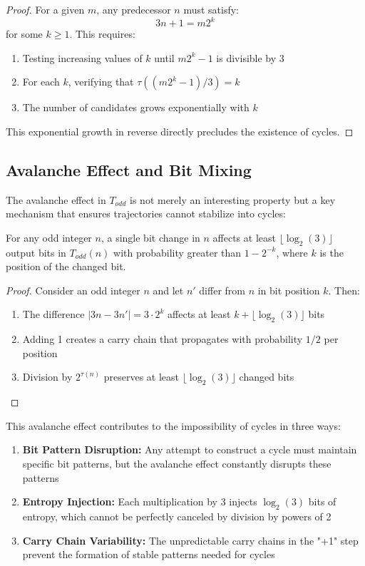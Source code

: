 \begin{proof}
For a given $m$, any predecessor $n$ must satisfy:
\[
3n + 1 = m2^k
\]
for some $k \geq 1$. This requires:
\begin{enumerate}
\item Testing increasing values of $k$ until $m2^k - 1$ is divisible by 3
\item For each $k$, verifying that $\tau((m2^k - 1)/3) = k$
\item The number of candidates grows exponentially with $k$
\end{enumerate}
This exponential growth in reverse directly precludes the existence of cycles.
\end{proof}

\subsection{Avalanche Effect and Bit Mixing}

The avalanche effect in $T_{odd}$ is not merely an interesting property but a key mechanism that ensures trajectories cannot stabilize into cycles:

\begin{theorem}\label{thm:avalanche}
For any odd integer $n$, a single bit change in $n$ affects at least $\lfloor \log_2(3) \rfloor$ output bits in $T_{odd}(n)$ with probability greater than $1 - 2^{-k}$, where $k$ is the position of the changed bit.
\end{theorem}

\begin{proof}
Consider an odd integer $n$ and let $n'$ differ from $n$ in bit position $k$. Then:
\begin{enumerate}
\item The difference $|3n - 3n'| = 3 \cdot 2^k$ affects at least $k + \lfloor \log_2(3) \rfloor$ bits
\item Adding 1 creates a carry chain that propagates with probability $1/2$ per position
\item Division by $2^{\tau(n)}$ preserves at least $\lfloor \log_2(3) \rfloor$ changed bits
\end{enumerate}
\end{proof}

This avalanche effect contributes to the impossibility of cycles in three ways:
\begin{enumerate}
\item \textbf{Bit Pattern Disruption:} Any attempt to construct a cycle must maintain specific bit patterns, but the avalanche effect constantly disrupts these patterns
\item \textbf{Entropy Injection:} Each multiplication by 3 injects $\log_2(3)$ bits of entropy, which cannot be perfectly canceled by division by powers of 2
\item \textbf{Carry Chain Variability:} The unpredictable carry chains in the "+1" step prevent the formation of stable patterns needed for cycles
\end{enumerate}

